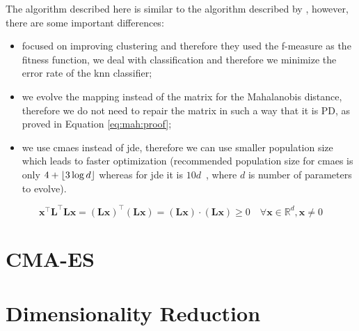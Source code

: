 \documentclass[12pt,a4paper]{report}
\begin{document}
The algorithm described here is similar to the algorithm described by \cite{fukui2013evolutionary}, however, there are some important differences:
\begin{itemize}
\item \cite{fukui2013evolutionary} focused on improving clustering and therefore they used the f-measure as the fitness function, we deal with classification and therefore we minimize the error rate of the \ac{knn} classifier;
\item we evolve the mapping instead of the matrix for the Mahalanobis distance, therefore we do not need to repair the matrix in such a way that it is PD, as proved in Equation \ref{eq:mah:proof};
\item we use \ac{cmaes} instead of \ac{jde}, therefore we can use smaller population size which leads to faster optimization (recommended population size for \ac{cmaes} is only $4+\lfloor3\log{d}\rfloor$ \cite{hansen2006cma} whereas for \ac{jde} it is $10d$~\cite{brest2006self}, where $d$ is number of parameters to evolve).
\end{itemize}

\begin{equation}
\bm{x}^\top \bm{L}^\top \bm{L}\bm{x}=(\bm{Lx})^\top(\bm{Lx})=(\bm{Lx})\cdot (\bm{Lx})\geq 0 \quad \forall \bm{x} \in \mathbb{R}^d, \bm{x} \neq 0 \label{eq:mah:proof}
\end{equation}

\section{CMA-ES} \label{alg:cmaes}



\section{Dimensionality Reduction} \label{chap:dr}
\end{document}
